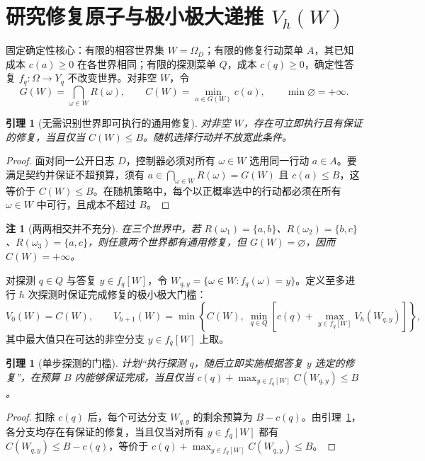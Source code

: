 \documentclass[11pt,a4paper]{article}
\theoremstyle{preprintthm}
\newtheorem{lemma}[theorem]{引理}
\theoremstyle{preprintdef}
\newtheorem{remark}[theorem]{注}
\begin{document}
\section{研究修复原子与极小极大递推 \texorpdfstring{$V_h(W)$}{V\_h(W)}}

固定确定性核心：有限的相容世界集 $W=\Omega_D$；有限的修复行动菜单 $A$，其已知成本 $c(a)\ge0$ 在各世界相同；有限的探测菜单 $Q$，成本 $c(q)\ge0$，确定性答复 $f_q:\Omega\to Y_q$ 不改变世界。对非空 $W$，令
\begin{equation}
  G(W)=\bigcap_{\omega\in W}R(\omega),\qquad
  C(W)=\min_{a\in G(W)}c(a),\qquad
  \min\varnothing=+\infty.
\end{equation}

\begin{lemma}[无需识别世界即可执行的通用修复]
\label{lem:common_repair}
对非空 $W$，存在可立即执行且有保证的修复，当且仅当 $C(W)\le B$。随机选择行动并不放宽此条件。
\end{lemma}
\begin{proof}
面对同一公开日志 $D$，控制器必须对所有 $\omega\in W$ 选用同一行动 $a\in A$。要满足契约并保证不超预算，须有 $a\in\bigcap_{\omega\in W}R(\omega)=G(W)$ 且 $c(a)\le B$，这等价于 $C(W)\le B$。在随机策略中，每个以正概率选中的行动都必须在所有 $\omega\in W$ 中可行，且成本不超过 $B$。
\end{proof}

\begin{remark}[两两相交并不充分]
在三个世界中，若 $R(\omega_1)=\{a,b\}$、$R(\omega_2)=\{b,c\}$、$R(\omega_3)=\{a,c\}$，则任意两个世界都有通用修复，但 $G(W)=\varnothing$，因而 $C(W)=+\infty$。
\end{remark}

对探测 $q\in Q$ 与答复 $y\in f_q[W]$，令 $W_{q,y}=\{\omega\in W:f_q(\omega)=y\}$。定义至多进行 $h$ 次探测时保证完成修复的极小极大门槛：
\begin{equation}
  V_0(W)=C(W),\qquad
  V_{h+1}(W)=\min\!\left\{C(W),\;\min_{q\in Q}\!\left[c(q)+\max_{y\in f_q[W]}V_h(W_{q,y})\right]\right\},
\end{equation}
其中最大值只在可达的非空分支 $y\in f_q[W]$ 上取。

\begin{lemma}[单步探测的门槛]
\label{lem:one_step}
计划“执行探测 $q$，随后立即实施根据答复 $y$ 选定的修复”，在预算 $B$ 内能够保证完成，当且仅当 $c(q)+\max_{y\in f_q[W]}C(W_{q,y})\le B$。
\end{lemma}
\begin{proof}
扣除 $c(q)$ 后，每个可达分支 $W_{q,y}$ 的剩余预算为 $B-c(q)$。由引理~\ref{lem:common_repair}，各分支均存在有保证的修复，当且仅当对所有 $y\in f_q[W]$ 都有 $C(W_{q,y})\le B-c(q)$，等价于 $c(q)+\max_{y\in f_q[W]}C(W_{q,y})\le B$。
\end{proof}
\end{document}
